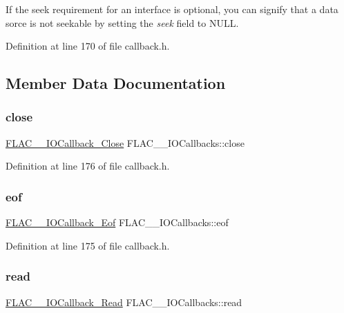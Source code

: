 If the seek requirement for an interface is optional, you can signify that a data sorce is not seekable by setting the {\itshape seek} field to {\ttfamily N\+U\+LL}. 

Definition at line 170 of file callback.\+h.



\subsection{Member Data Documentation}
\mbox{\label{struct_f_l_a_c_____i_o_callbacks_a8e447ae1999d9da9ebad5417f47223be}} 
\subsubsection{\texorpdfstring{close}{close}}
{\footnotesize\ttfamily \mbox{\hyperlink{group__flac__callbacks_ga0032267fac38220689778833e08f7387}{F\+L\+A\+C\+\_\+\+\_\+\+I\+O\+Callback\+\_\+\+Close}} F\+L\+A\+C\+\_\+\+\_\+\+I\+O\+Callbacks\+::close}



Definition at line 176 of file callback.\+h.

\mbox{\label{struct_f_l_a_c_____i_o_callbacks_a4810838b77667dc02415c854b2103e66}} 
\subsubsection{\texorpdfstring{eof}{eof}}
{\footnotesize\ttfamily \mbox{\hyperlink{group__flac__callbacks_ga00ae3b3d373e691908e9539ebf720675}{F\+L\+A\+C\+\_\+\+\_\+\+I\+O\+Callback\+\_\+\+Eof}} F\+L\+A\+C\+\_\+\+\_\+\+I\+O\+Callbacks\+::eof}



Definition at line 175 of file callback.\+h.

\mbox{\label{struct_f_l_a_c_____i_o_callbacks_a6dd767bc254e31dc47c9a0d218e72190}} 
\subsubsection{\texorpdfstring{read}{read}}
{\footnotesize\ttfamily \mbox{\hyperlink{group__flac__callbacks_ga49d95218a6c09b215cd92cc96de71bf9}{F\+L\+A\+C\+\_\+\+\_\+\+I\+O\+Callback\+\_\+\+Read}} F\+L\+A\+C\+\_\+\+\_\+\+I\+O\+Callbacks\+::read}



